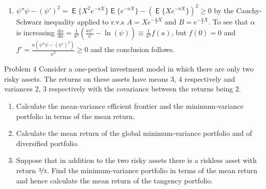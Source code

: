 \documentclass[10pt,handout]{beamer}
\newcommand{\ds}{\displaystyle}
\DeclareMathOperator\expc{\mathsf{E}}
\theoremstyle{definition}
\begin{document}
\begin{frame}[allowframebreaks]
\begin{enumerate}
    \item $\ds\psi''\psi - (\psi')^2 = \expc\big\{X^2e^{-aX}\big\}\expc\big\{e^{-aX}\big\} - (\expc\big\{Xe^{-aX}\big\})^2 \geqslant 0$
      by the Cauchy-Schwarz inequality applied to r.v.s $\ds A = Xe^{-\frac{a}{2}X}$ and $\ds B = e^{-\frac{a}{2}X}$. To see that $\alpha$ is increasing $\ds\frac{\text{d}\alpha}{\text{d}a} = \frac{1}{a^2}\left(\frac{a\psi'}{\psi} - \ln (\psi)\right)\equiv\frac{1}{a^2}f(a)$, but $f(0) = 0$ and $\ds f' = \frac{a(\psi''\psi - (\psi')^2)}{\psi^2}\geqslant 0$ and the conclusion follows.
  \end{enumerate}
\end{frame}

\begin{frame}{Problem 4}
  Consider a one-period investment model in which there are only two risky assets. The returns on these assets have means $3$, $4$ respectively and variances $2$, $3$ respectively with the covariance between the returns being $2$.
  \begin{enumerate}
    \item Calculate the mean-variance efficient frontier and the minimum-variance portfolio in terms of the mean return.
    \item Calculate the mean return of the global minimum-variance portfolio and of diversified portfolio.
    \item Suppose that in addition to the two risky assets there is a riskless asset with return $\nicefrac{3}{2}$. Find the minimum-variance portfolio in terms of the mean return and hence calculate the mean return of the tangency portfolio.
  \end{enumerate}
\end{frame}
\end{document}
